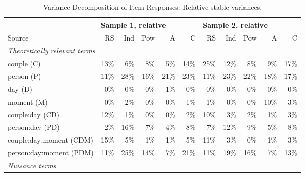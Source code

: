 \documentclass[jou,a4paper,draftfirst]{apa6}\usepackage[]{graphicx}\usepackage[]{color}
\begin{document}
\begin{table*}	
	\begin{threeparttable}
		\footnotesize
		\caption{Variance Decomposition of Item Responses: Relative stable variances.}
		\label{tab:varDecompRel}
		\begin{tabular}{lrrrrrrrrrr}
			\toprule			
			
 			 & \multicolumn{5}{l}{Sample 1, relative} & \multicolumn{5}{l}{Sample 2, relative}  \\ 
			
			
			\midrule	
					   
 			Source & RS & Ind & Pow & A & C & RS & Ind & Pow & A & C\\ 
			
			\midrule			   

  \multicolumn{6}{l}{\emph{Theoretically relevant terms}} &&&&&\\ 
 
 couple (C) & 13\% & 6\% & 8\% & 5\% & 14\% & 25\% & 12\% & 8\% & 9\% & 17\% \\ 
  person (P) & 11\% & 28\% & 16\% & 21\% & 23\% & 11\% & 23\% & 22\% & 18\% & 17\% \\ 
  day (D) & 0\% & 0\% & 0\% & 1\% & 0\% & 0\% & 0\% & 0\% & 0\% & 0\% \\ 
  moment (M) & 0\% & 2\% & 0\% & 0\% & 1\% & 1\% & 0\% & 0\% & 10\% & 3\% \\ 
  couple:day (CD) & 12\% & 1\% & 0\% & 0\% & 2\% & 10\% & 3\% & 2\% & 1\% & 3\% \\ 
  person:day (PD) & 2\% & 16\% & 7\% & 4\% & 8\% & 7\% & 12\% & 9\% & 5\% & 8\% \\ 
  couple:day:moment (CDM) & 15\% & 5\% & 1\% & 1\% & 5\% & 11\% & 3\% & 0\% & 1\% & 3\% \\ 
  person:day:moment (PDM) & 11\% & 25\% & 14\% & 7\% & 21\% & 11\% & 19\% & 16\% & 7\% & 13\% \\ 
  

\midrule	

  \multicolumn{6}{l}{\emph{Nuisance terms}} &&&&&\\ 
 

\end{tabular}
\end{threeparttable}
\end{table*}
\end{document}
